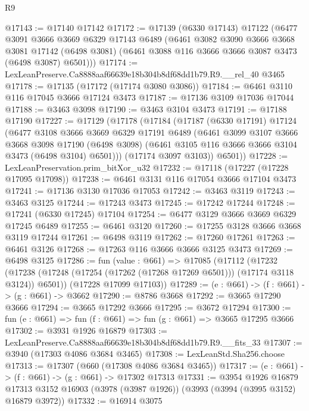\begin{lexlean}{R9}
\begin{coremodule}
@17143 := @17140 @17142
@17172 := @17139
    (@6330 @17143)
    @17122
    (@6477
      @3091
      @3666
      @3669
      @6329
      @17143
      @6489
      (@6461
        @3082
        @3090
        @3666
        @3668
        @3081
        @17142
        (@6498 @3081)
        (@6461 @3088 @116 @3666 @3666 @3087 @3473 (@6498 @3087) @6501)))
@17174 := LexLeanPreserve.Ca8888aaf66639e18b304b8df68dd1b79.R9.__rel_40 @3465
@17178 := @17135 (@17172 (@17174 @3080 @3086))
@17184 := @6461 @3110 @116 @17045 @3666 @17124 @3473
@17187 := @17136 @3109 @17036 @17044
@17188 := @3463 @3098
@17190 := @3463 @3104 @3473
@17191 := @17188 @17190
@17227 := @17129
    (@17178
      (@17184
        (@17187
          (@6330 @17191)
          @17124
          (@6477
            @3108
            @3666
            @3669
            @6329
            @17191
            @6489
            (@6461
              @3099
              @3107
              @3666
              @3668
              @3098
              @17190
              (@6498 @3098)
              (@6461 @3105 @116 @3666 @3666 @3104 @3473 (@6498 @3104) @6501)))
          (@17174 @3097 @3103))
        @6501))
@17228 := LexLeanPreservation.prim_bitXor_u32
@17232 := @17118 (@17227 (@17228 @17095 @17098))
@17238 := @6461 @3131 @116 @17054 @3666 @17104 @3473
@17241 := @17136 @3130 @17036 @17053
@17242 := @3463 @3119
@17243 := @3463 @3125
@17244 := @17243 @3473
@17245 := @17242 @17244
@17248 := @17241 (@6330 @17245) @17104
@17254 := @6477 @3129 @3666 @3669 @6329 @17245 @6489
@17255 := @6461 @3120
@17260 := @17255 @3128 @3666 @3668 @3119 @17244
@17261 := @6498 @3119
@17262 := @17260 @17261
@17263 := @6461 @3126
@17268 := @17263 @116 @3666 @3666 @3125 @3473
@17269 := @6498 @3125
@17286 := fun (value : @661) =>
  @17085
    (@17112
      (@17232 (@17238 (@17248 (@17254 (@17262 (@17268 @17269 @6501))) (@17174 @3118 @3124)) @6501))
      (@17228 @17099 @17103))
@17289 := (e : @661) -> (f : @661) -> (g : @661) -> @3662
@17290 := @8786 @3668
@17292 := @3665 @17290 @3666
@17294 := @3665 @17292 @3666
@17295 := @3672 @17294
@17300 := fun (e : @661) => fun (f : @661) => fun (g : @661) => @3665 @17295 @3666
@17302 := @3931 @1926 @16879
@17303 := LexLeanPreserve.Ca8888aaf66639e18b304b8df68dd1b79.R9.__fits_33
@17307 := @3940 (@17303 @4086 @3684 @3465)
@17308 := LexLeanStd.Sha256.choose
@17313 := @17307 (@660 (@17308 @4086 @3684 @3465))
@17317 := (e : @661) -> (f : @661) -> (g : @661) -> @17302 @17313
@17331 := @3954
    @1926
    @16879
    @17313
    @3152
    @16903
    (@3978 (@3987 @1926))
    (@3993 (@3994 (@3995 @3152) @16879 @3972))
@17332 := @16914 @3075

\end{coremodule}
\end{lexlean}
